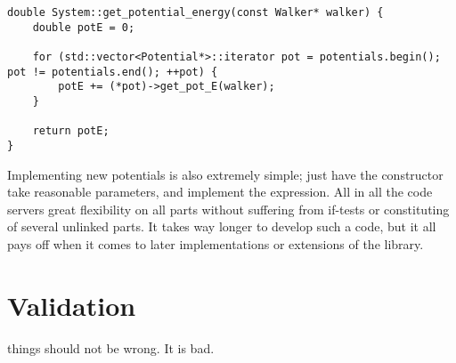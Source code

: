 \vspace{0.5cm}
\begin{lstlisting}
double System::get_potential_energy(const Walker* walker) {
    double potE = 0;

    for (std::vector<Potential*>::iterator pot = potentials.begin(); pot != potentials.end(); ++pot) {
        potE += (*pot)->get_pot_E(walker);
    }

    return potE;
}
\end{lstlisting}

Implementing new potentials is also extremely simple; just have the constructor take reasonable parameters, and implement the expression. All in all the code servers great flexibility on all parts without suffering from if-tests or constituting of several unlinked parts. It takes way longer to develop such a code, but it all pays off when it comes to later implementations or extensions of the library.

\section{Validation}

things should not be wrong. It is bad.


